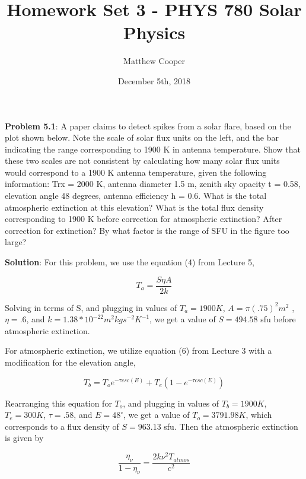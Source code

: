\documentclass{article}
\title{Homework Set 3 - PHYS 780 Solar Physics}
\author{Matthew Cooper}
\date{December 5th, 2018}
\begin{document}
\begin{titlepage}
\maketitle
\end{titlepage}

\textbf{Problem 5.1}:  A paper claims to detect spikes from a solar flare, based on the plot shown below.  Note the scale of solar flux units on the left, and the bar indicating the range corresponding to 1900 K in antenna temperature.  Show that these two scales are not consistent by calculating how many solar flux units would correspond to a 1900 K antenna temperature, given the following information: Trx = 2000 K, antenna diameter 1.5 m, zenith sky opacity t = 0.58, elevation angle 48 degrees, antenna efficiency h = 0.6.  What is the total atmospheric extinction at this elevation?  What is the total flux density corresponding to 1900 K before correction for atmospheric extinction?  After correction for extinction?  By what factor is the range of SFU in the figure too large?

\bigskip
\textbf{Solution}:  For this problem, we use the equation (4) from Lecture 5, 

\begin{equation}
T_{a} = \frac{S \eta A}{2k} 
\end{equation}

Solving in terms of S, and plugging in values of $T_a = 1900 K$, $A = \pi (.75)^2 m^2$ , $\eta = .6$, and $k = 1.38*10^{-22} m^2kgs^{-2}K^{-1}$, we get a value of $S = 494.58$ sfu before atmospheric extinction.  

For atmospheric extinction, we utilize equation (6) from Lecture 3 with a modification for the elevation angle, 

\begin{equation}
T_b = T_o e^{-\tau csc(E)} + T_e(1 - e^{-\tau csc(E)})
\end{equation}

Rearranging this equation for $T_o$, and plugging in values of $T_b = 1900 K$, $T_e = 300 K$, $\tau = .58$, and $E = 48^\circ$, we get a value of $T_o = 3791.98 K$, which corresponds to a flux density of $S = 963.13$ sfu.  Then the atmospheric extinction is given by 

\begin{equation}
\frac{\eta_{\nu}}{1 - \eta_{\nu}} = \frac{2k \nu^2T_{atmos}}{c^2}
\end{equation}
\end{document}
